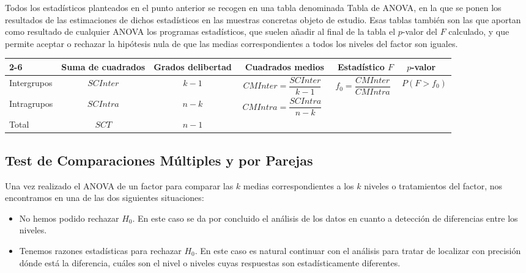 Todos los estadísticos planteados en el punto anterior se recogen en una tabla denominada Tabla de ANOVA, en la que se
ponen los resultados de las estimaciones de dichos estadísticos en las muestras concretas objeto de estudio.
Esas tablas también son las que aportan como resultado de cualquier ANOVA los programas estadísticos, que suelen añadir
al final de la tabla el $p$-valor del $F$ calculado, y que permite aceptar o rechazar la hipótesis nula de que las
medias correspondientes a todos los niveles del factor son iguales.
\begin{center}
\renewcommand{\arraystretch}{2}
\begin{tabular}{|l|l|l|l|l|l|}
\cline{2-6}
\multicolumn{1}{c|}{} & \multicolumn{1}{p{1.5cm}|}{\centering Suma de \newline cuadrados} & \multicolumn{1}{p{1.8cm}|}{\centering Grados de\newline libertad} & \multicolumn{1}{p{3.5cm}|}{\centering\ \newline Cuadrados medios} & \multicolumn{1}{p{2.5cm}|}{\centering\ \newline Estadístico $F$} & \multicolumn{1}{p{1.5cm}|}{\centering\ \newline $p$-valor} \\

\hline
\multicolumn{1}{|l|}{Intergrupos} & \multicolumn{1}{c|}{$SCInter$} & \multicolumn{1}{c|}{$k-1$} & \multicolumn{1}{c|}{$CMInter = \dfrac{{SCInter}}{{k - 1}}$} & \multicolumn{1}{c|}{$f_0=\dfrac{{CMInter}}{{CMIntra}}$} & \multicolumn{1}{c|}{$P\left( {F > f_0} \right)$} \\
\hline
\multicolumn{1}{|l|}{Intragrupos} & \multicolumn{1}{c|}{$SCIntra$} & \multicolumn{1}{c|}{$n-k$} & \multicolumn{1}{c|}{$CMIntra = \dfrac{{SCIntra}}{{n -k}}$} & \multicolumn{1}{c|}{} & \multicolumn{1}{c|}{} \\
\hline
\multicolumn{1}{|l|}{Total} & \multicolumn{1}{c|}{$SCT$} & \multicolumn{1}{c|}{$n-1$} & \multicolumn{1}{c|}{} & \multicolumn{1}{c|}{} &  \\
\hline
\end{tabular}
\end{center}


\subsection*{Test de Comparaciones Múltiples y por Parejas} 
Una vez realizado el ANOVA de un factor para comparar las
$k$ medias correspondientes a los $k$ niveles o tratamientos del factor, nos encontramos en una de las dos siguientes
situaciones:
\begin{itemize}
\item No hemos podido rechazar $H_0$. En este caso se da por concluido el análisis de los datos en cuanto a detección de
diferencias entre los niveles.
\item Tenemos razones estadísticas para rechazar $H_0$. En este caso es natural continuar con el análisis para tratar de
localizar con precisión dónde está la diferencia, cuáles son el nivel o niveles cuyas respuestas son estadísticamente
diferentes.
\end{itemize}

